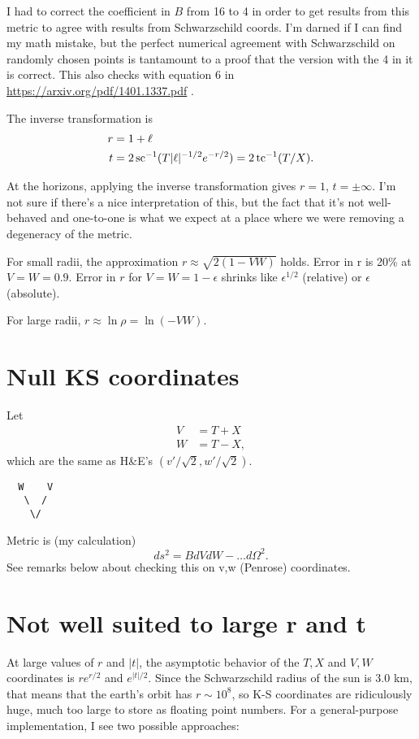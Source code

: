\documentclass{article}
\begin{document}
I had to correct the coefficient in $B$ from 16 to 4
in order to get results from this metric to agree with results from Schwarzschild coords.
I'm darned if I can find my math mistake, but the perfect numerical agreement with
Schwarzschild on randomly chosen points is tantamount to a proof that the version with
the 4 in it is correct. This also checks with equation 6 in \url{https://arxiv.org/pdf/1401.1337.pdf} .

The inverse transformation is
\begin{align}
  r &= 1+\ell  \\
  t &= 2\operatorname{sc}^{-1}(T|\ell |^{-1/2}e^{-r/2}) = 2\operatorname{tc}^{-1}(T/X).
\end{align}

At the horizons, applying the inverse transformation gives $r=1$, $t=\pm\infty$. I'm not
sure if there's a nice interpretation of this, but the fact that it's not well-behaved
and one-to-one is what we expect at a place where we were removing a degeneracy of the metric.

For small radii,
the approximation $r\approx\sqrt{2(1-VW)}$ holds. 
Error in r is 20\% at $V=W=0.9$. Error in $r$ for $V=W=1-\epsilon$
shrinks like $\epsilon^{1/2}$ (relative) or $\epsilon$ (absolute).

For large radii, $r\approx \ln\rho =\ln(-VW)$.

\section{Null KS coordinates}

Let
\begin{align}
  V &= T+X\\
  W &= T-X,
\end{align}
which are the same as H\&E's $(v'/\sqrt2,w'/\sqrt2)$.
\begin{verbatim}
  W    V
   \  /
    \/
\end{verbatim}
Metric is (my calculation)
\begin{equation}
  ds^2 = B dVdW-\ldots d\Omega^2.
\end{equation}
See remarks below about checking this on v,w (Penrose) coordinates.

\section{Not well suited to large r and t}

At large values of $r$ and $|t|$, the asymptotic behavior of the $T,X$ and $V,W$ coordinates
is $re^{r/2}$ and $e^{|t|/2}$. Since the Schwarzschild radius of the sun is 3.0 km, that means
that the earth's orbit has $r\sim 10^8$, so K-S coordinates are ridiculously huge, much too
large to store as floating point numbers. For a general-purpose implementation, I see two possible
approaches:
\end{document}
